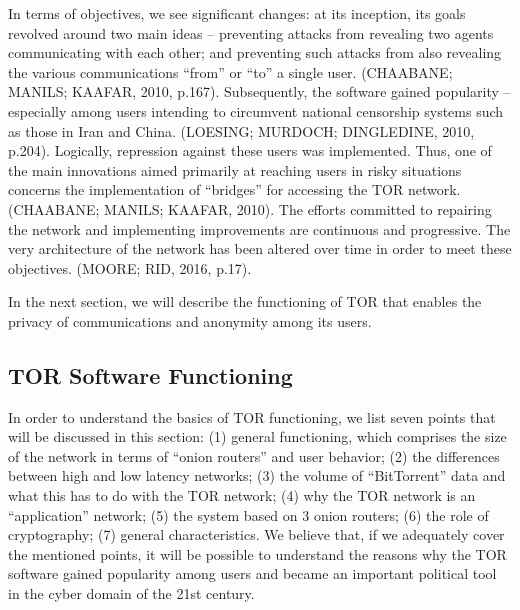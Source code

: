 In terms of objectives, we see significant changes: at its inception, its goals revolved around two main ideas -- preventing attacks from revealing two agents communicating with each other; and preventing such attacks from also revealing the various communications ``from'' or ``to'' a single user. (CHAABANE; MANILS; KAAFAR, 2010, p.167). Subsequently, the software gained popularity -- especially among users intending to circumvent national censorship systems such as those in Iran and China. (LOESING; MURDOCH; DINGLEDINE, 2010, p.204). Logically, repression against these users was implemented. Thus, one of the main innovations aimed primarily at reaching users in risky situations concerns the implementation of ``bridges'' for accessing the TOR network. (CHAABANE; MANILS; KAAFAR, 2010). The efforts committed to repairing the network and implementing improvements are continuous and progressive. The very architecture of the network has been altered over time in order to meet these objectives. (MOORE; RID, 2016, p.17).

In the next section, we will describe the functioning of TOR that enables the privacy of communications and anonymity among its users.

\subsection{TOR Software Functioning}

In order to understand the basics of TOR functioning, we list seven points that will be discussed in this section: (1) general functioning, which comprises the size of the network in terms of ``onion routers'' and user behavior; (2) the differences between high and low latency networks; (3) the volume of ``BitTorrent'' data and what this has to do with the TOR network; (4) why the TOR network is an ``application'' network; (5) the system based on 3 onion routers; (6) the role of cryptography; (7) general characteristics. We believe that, if we adequately cover the mentioned points, it will be possible to understand the reasons why the TOR software gained popularity among users and became an important political tool in the cyber domain of the 21st century.

